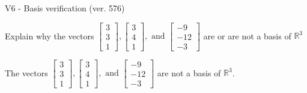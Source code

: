 \begin{exercise}
  \begin{exerciseTitle}V6 - Basis verification (ver. 576)\end{exerciseTitle}
  \begin{exerciseStatement}
    Explain why the vectors \(\left[\begin{array}{r}
3 \\
3 \\
1
\end{array}\right] , \left[\begin{array}{r}
3 \\
4 \\
1
\end{array}\right] , \text{ and } \left[\begin{array}{r}
-9 \\
-12 \\
-3
\end{array}\right]\) are or are not a basis of \(\mathbb{R}^3\)	


  \end{exerciseStatement}
  \begin{exerciseAnswer}
   The vectors \(\left[\begin{array}{r}
3 \\
3 \\
1
\end{array}\right] , \left[\begin{array}{r}
3 \\
4 \\
1
\end{array}\right] , \text{ and } \left[\begin{array}{r}
-9 \\
-12 \\
-3
\end{array}\right]\) 
  	 are not  a basis of \(\mathbb{R}^3\).
  


  \end{exerciseAnswer}
\end{exercise}